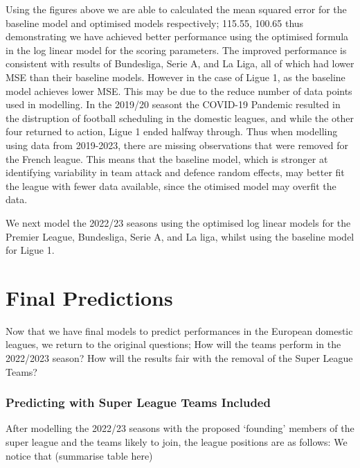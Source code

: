 \documentclass[
]{article}
\begin{document}
Using the figures above we are able to calculated the mean squared error
for the baseline model and optimised models respectively; 115.55, 100.65
thus demonstrating we have achieved better performance using the
optimised formula in the log linear model for the scoring parameters.
The improved performance is consistent with results of Bundesliga, Serie
A, and La Liga, all of which had lower MSE than their baseline models.
However in the case of Ligue 1, as the baseline model achieves lower
MSE. This may be due to the reduce number of data points used in
modelling. In the 2019/20 seasont the COVID-19 Pandemic resulted in the
distruption of football scheduling in the domestic leagues, and while
the other four returned to action, Ligue 1 ended halfway through. Thus
when modelling using data from 2019-2023, there are missing observations
that were removed for the French league. This means that the baseline
model, which is stronger at identifying variability in team attack and
defence random effects, may better fit the league with fewer data
available, since the otimised model may overfit the data.

We next model the 2022/23 seasons using the optimised log linear models
for the Premier League, Bundesliga, Serie A, and La liga, whilst using
the baseline model for Ligue 1.

\hypertarget{final-predictions}{%
\section{Final Predictions}\label{final-predictions}}

Now that we have final models to predict performances in the European
domestic leagues, we return to the original questions; How will the
teams perform in the 2022/2023 season? How will the results fair with
the removal of the Super League Teams?

\hypertarget{predicting-with-super-league-teams-included}{%
\subsubsection{Predicting with Super League Teams
Included}\label{predicting-with-super-league-teams-included}}

After modelling the 2022/23 seasons with the proposed `founding' members
of the super league and the teams likely to join, the league positions
are as follows: We notice that (summarise table here)
\end{document}
